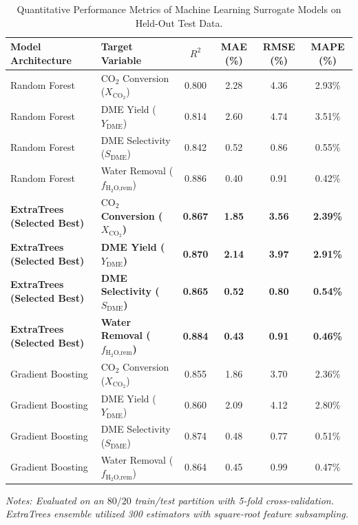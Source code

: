 \documentclass[12pt,a4paper]{article}
\begin{document}
\begin{table}[htbp]
\centering
\caption{Quantitative Performance Metrics of Machine Learning Surrogate Models on Held-Out Test Data.}
\label{tab:ml_metrics}
\begin{tabular*}{\textwidth}{@{\extracolsep{\fill}}llcccc@{}}
\toprule
\textbf{Model Architecture} & \textbf{Target Variable} & \textbf{$R^2$} & \textbf{MAE (\%)} & \textbf{RMSE (\%)} & \textbf{MAPE (\%)} \\
\midrule
Random Forest & $\text{CO}_2$ Conversion ($X_{\text{CO}_2}$) & 0.800 & 2.28 & 4.36 & 2.93\% \\
Random Forest & DME Yield ($Y_{\text{DME}}$) & 0.814 & 2.60 & 4.74 & 3.51\% \\
Random Forest & DME Selectivity ($S_{\text{DME}}$) & 0.842 & 0.52 & 0.86 & 0.55\% \\
Random Forest & Water Removal ($f_{\text{H}_2\text{O,rem}}$) & 0.886 & 0.40 & 0.91 & 0.42\% \\
\textbf{ExtraTrees (Selected Best)} & \textbf{$\text{CO}_2$ Conversion ($X_{\text{CO}_2}$)} & \textbf{0.867} & \textbf{1.85} & \textbf{3.56} & \textbf{2.39\%} \\
\textbf{ExtraTrees (Selected Best)} & \textbf{DME Yield ($Y_{\text{DME}}$)} & \textbf{0.870} & \textbf{2.14} & \textbf{3.97} & \textbf{2.91\%} \\
\textbf{ExtraTrees (Selected Best)} & \textbf{DME Selectivity ($S_{\text{DME}}$)} & \textbf{0.865} & \textbf{0.52} & \textbf{0.80} & \textbf{0.54\%} \\
\textbf{ExtraTrees (Selected Best)} & \textbf{Water Removal ($f_{\text{H}_2\text{O,rem}}$)} & \textbf{0.884} & \textbf{0.43} & \textbf{0.91} & \textbf{0.46\%} \\
Gradient Boosting & $\text{CO}_2$ Conversion ($X_{\text{CO}_2}$) & 0.855 & 1.86 & 3.70 & 2.36\% \\
Gradient Boosting & DME Yield ($Y_{\text{DME}}$) & 0.860 & 2.09 & 4.12 & 2.80\% \\
Gradient Boosting & DME Selectivity ($S_{\text{DME}}$) & 0.874 & 0.48 & 0.77 & 0.51\% \\
Gradient Boosting & Water Removal ($f_{\text{H}_2\text{O,rem}}$) & 0.864 & 0.45 & 0.99 & 0.47\% \\
\bottomrule
\end{tabular*}
\vspace{2pt}
{\raggedright\small\itshape Notes: Evaluated on an $80/20$ train/test partition with 5-fold cross-validation. ExtraTrees ensemble utilized 300 estimators with square-root feature subsampling.\par}
\end{table}
\end{document}
